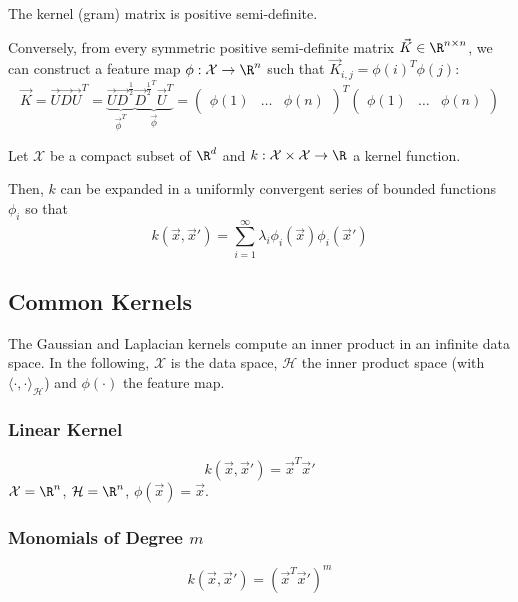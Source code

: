 The kernel (gram) matrix is positive semi-definite.

Conversely, from every symmetric positive semi-definite
matrix $\vec{K} \in \R^{n \times n}$,
we can construct a feature map
$\phi : \mathcal{X} \to \R^n$ such that
$\vec{K}_{i,j} = \phi(i)^T \phi(j)$:
\begin{equation*}
\vec{K} = \vec{U}\vec{D}\vec{U}^T
= \underbrace{\vec{U} \vec{D}^{\frac{1}{2}}}_{\vec{\phi}^T}
\underbrace{\vec{D}^{\frac{1}{2}^T} \vec{U}^T}_{\vec{\phi}}
=
\left(
\begin{array}{c|c|c}
\phi(1) & \dots & \phi(n)
\end{array}
\right)^T
\left(
\begin{array}{c|c|c}
\phi(1) & \dots & \phi(n)
\end{array}
\right)
\end{equation*}

\begin{theorem}
	Let $\mathcal{X}$ be a compact subset of
	$\R^d$ and
	$k : \mathcal{X} \times \mathcal{X} \to \R$
	a kernel function.
	
	Then, $k$ can be expanded in a uniformly convergent
	series of bounded functions $\phi_i$ so that
	\begin{equation*}
	k(\vec{x}, \vec{x}') =
	\sum_{i=1}^{\infty}{
		\lambda_i \phi_i(\vec{x}) \phi_i(\vec{x}')
	}
	\end{equation*}
\end{theorem}


\subsection{Common Kernels}
The Gaussian and Laplacian kernels compute an inner product
in an infinite data space.
In the following, $\mathcal{X}$ is the data space,
$\mathcal{H}$ the inner product space
(with $\langle \cdot , \cdot \rangle_\mathcal{H}$)
and $\phi(\cdot)$ the feature map.

\subsubsection{Linear Kernel}
\begin{equation*}
k(\vec{x}, \vec{x}') = \vec{x}^T \vec{x}'
\end{equation*}
$\mathcal{X} = \R^n$,
$\mathcal{H} = \R^n$,
$\phi(\vec{x}) = \vec{x}$.

\subsubsection{Monomials of Degree $m$}
\begin{equation*}
k(\vec{x}, \vec{x}') = (\vec{x}^T \vec{x}')^m
\end{equation*}

